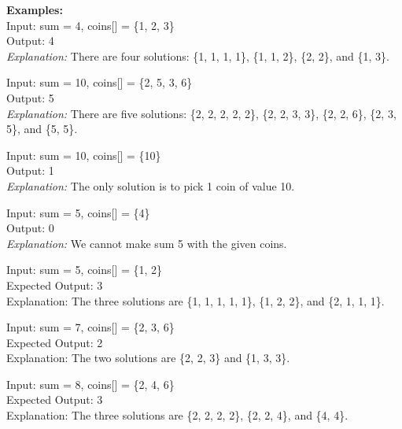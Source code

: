 \documentclass[12pt]{article}
\begin{document}
\begin{enumerate}
    \textbf{Examples:} \\
    Input: sum = 4, coins[] = \{1, 2, 3\} \\
    Output: 4 \\
    \textit{Explanation:} There are four solutions: \{1, 1, 1, 1\}, \{1, 1, 2\}, \{2, 2\}, and \{1, 3\}.
    
    Input: sum = 10, coins[] = \{2, 5, 3, 6\} \\
    Output: 5 \\
    \textit{Explanation:} There are five solutions: \{2, 2, 2, 2, 2\}, \{2, 2, 3, 3\}, \{2, 2, 6\}, \{2, 3, 5\}, and \{5, 5\}.
    
    Input: sum = 10, coins[] = \{10\} \\
    Output: 1 \\
    \textit{Explanation:} The only solution is to pick 1 coin of value 10.
    
    Input: sum = 5, coins[] = \{4\} \\
    Output: 0 \\
    \textit{Explanation:} We cannot make sum 5 with the given coins.
    
    Input: sum = 5, coins[] = \{1, 2\} \\
    Expected Output: 3 \\
    Explanation: The three solutions are \{1, 1, 1, 1, 1\}, \{1, 2, 2\}, and \{2, 1, 1, 1\}.
    
    Input: sum = 7, coins[] = \{2, 3, 6\} \\
    Expected Output: 2 \\
    Explanation: The two solutions are \{2, 2, 3\} and \{1, 3, 3\}.
    
    Input: sum = 8, coins[] = \{2, 4, 6\} \\
    Expected Output: 3 \\
    Explanation: The three solutions are \{2, 2, 2, 2\}, \{2, 2, 4\}, and \{4, 4\}.
    
    
\end{enumerate}
\end{document}
